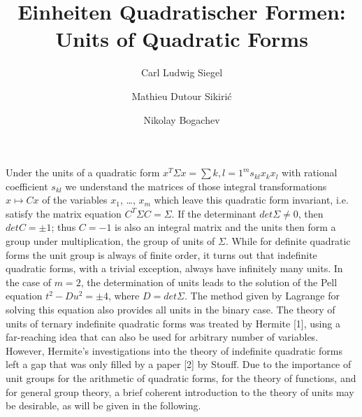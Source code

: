 \documentclass[10pt]{amsart}
\title{Einheiten Quadratischer Formen: Units of Quadratic Forms}
\begin{document}

\author[C.L. Siegel]{Carl Ludwig Siegel}

\author[M. D. Sikiri\'c]{Mathieu Dutour Sikiri\'c}
\address{Mathieu Dutour Sikiri\'c, Rudjer Boskovi\'c Institute, Bijeni\v{c}ka 54, 10000 Zagreb, Croatia}

\author[N. Bogachev]{Nikolay Bogachev}
\address{University of Toronto, Canada}


\newcommand{\RR}{\ensuremath{\mathbb{R}}}
\newcommand{\NN}{\ensuremath{\mathbb{N}}}
\newcommand{\QQ}{\ensuremath{\mathbb{Q}}}
\newcommand{\CC}{\ensuremath{\mathbb{C}}}
\newcommand{\ZZ}{\ensuremath{\mathbb{Z}}}
\newcommand{\TT}{\ensuremath{\mathbb{T}}}

\newtheorem{theorem}{Theorem}[section]
\newtheorem{proposition}[theorem]{Proposition}
\newtheorem{corollary}[theorem]{Corollary}
\newtheorem{lemma}[theorem]{Lemma}
\newtheorem{problem}[theorem]{Problem}
\newtheorem{conjecture}{Conjecture}
\newtheorem{question}{Question}
\newtheorem{claim}{Claim}
\newtheorem{remark}[theorem]{Remark}
\theoremstyle{definition}
\newtheorem{definition}[theorem]{Definition}

\maketitle

Under the units of a quadratic form $x^T \Sigma x = \sum{k,l=1}^m s_{kl} x_k x_l$ with
rational coefficient $s_{kl}$ we understand the matrices of those integral transformations
$x\mapsto Cx$ of the variables $x_1$, \dots, $x_m$ which leave this quadratic form invariant,
i.e. satisfy the matrix equation $C^T \Sigma C = \Sigma$.
If the determinant $det \Sigma \not= 0$, then
$det C = \pm 1$; thus $C = −1$ is also an integral matrix and the units then form a group
under multiplication, the group of units of $\Sigma$. While for definite quadratic forms
the unit group is always of finite order, it turns out that indefinite quadratic forms,
with a trivial exception, always have infinitely many units.
In the case of $m = 2$, the determination of units leads to the solution of the
Pell equation $t^2 − D u^2 = \pm 4$, where $D = det \Sigma$. The method given by Lagrange
for solving this equation also provides all units in the binary case. The theory
of units of ternary indefinite quadratic forms was treated by Hermite [1], using a
far-reaching idea that can also be used for arbitrary number of variables. However,
Hermite’s investigations into the theory of indefinite quadratic forms left a gap that
was only filled by a paper [2] by Stouff.
Due to the importance of unit groups for the arithmetic of quadratic forms, for
the theory of functions, and for general group theory, a brief coherent introduction
to the theory of units may be desirable, as will be given in the following.
\end{document}
